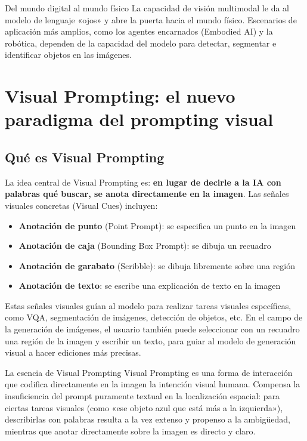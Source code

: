 \documentclass[a4paper]{article}
\begin{document}
\begin{knowledgebox}{Del mundo digital al mundo físico}
La capacidad de visión multimodal le da al modelo de lenguaje «ojos» y abre la puerta hacia el mundo físico. Escenarios de aplicación más amplios, como los agentes encarnados (Embodied AI) y la robótica, dependen de la capacidad del modelo para detectar, segmentar e identificar objetos en las imágenes.
\end{knowledgebox}

\section{Visual Prompting: el nuevo paradigma del prompting visual}

\subsection{Qué es Visual Prompting}

La idea central de Visual Prompting es: \textbf{en lugar de decirle a la IA con palabras qué buscar, se anota directamente en la imagen}. Las señales visuales concretas (Visual Cues) incluyen:

\begin{itemize}
    \item \textbf{Anotación de punto} (Point Prompt): se especifica un punto en la imagen
    \item \textbf{Anotación de caja} (Bounding Box Prompt): se dibuja un recuadro
    \item \textbf{Anotación de garabato} (Scribble): se dibuja libremente sobre una región
    \item \textbf{Anotación de texto}: se escribe una explicación de texto en la imagen
\end{itemize}

Estas señales visuales guían al modelo para realizar tareas visuales específicas, como VQA, segmentación de imágenes, detección de objetos, etc. En el campo de la generación de imágenes, el usuario también puede seleccionar con un recuadro una región de la imagen y escribir un texto, para guiar al modelo de generación visual a hacer ediciones más precisas.

\begin{importantbox}{La esencia de Visual Prompting}
Visual Prompting es una forma de interacción que codifica directamente en la imagen la intención visual humana. Compensa la insuficiencia del prompt puramente textual en la localización espacial: para ciertas tareas visuales (como «ese objeto azul que está más a la izquierda»), describirlas con palabras resulta a la vez extenso y propenso a la ambigüedad, mientras que anotar directamente sobre la imagen es directo y claro.
\end{importantbox}
\end{document}
